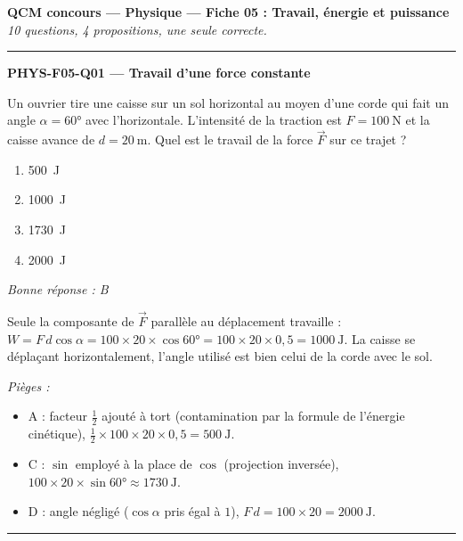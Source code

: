 \documentclass[11pt,a4paper]{article}
\newcommand{\vv}[1]{\vec{#1}}\newcommand{\ds}{\displaystyle}
\begin{document}
\begin{center}
{\large\bfseries QCM concours --- Physique --- Fiche 05 : Travail, énergie et puissance}\\
\textit{10 questions, 4 propositions, une seule correcte.}
\end{center}
\vspace{6pt}\hrule\vspace{10pt}

\noindent\textbf{PHYS-F05-Q01 --- Travail d'une force constante}\par
Un ouvrier tire une caisse sur un sol horizontal au moyen d'une corde qui fait un angle
$\alpha=\ang{60}$ avec l'horizontale. L'intensité de la traction est $F=\qty{100}{\newton}$ et la
caisse avance de $d=\qty{20}{\metre}$. Quel est le travail de la force $\vv F$ sur ce trajet ?
\begin{center}
\end{center}
\begin{enumerate}[label=\Alph*)]
\item \qty{500}{\joule}
\item \qty{1000}{\joule}
\item \qty{1730}{\joule}
\item \qty{2000}{\joule}
\end{enumerate}
\textit{Bonne réponse : B}\par
Seule la composante de $\vv F$ parallèle au déplacement travaille :
$W=F\,d\cos\alpha=100\times20\times\cos\ang{60}=100\times20\times0{,}5=\qty{1000}{\joule}$.
La caisse se déplaçant horizontalement, l'angle utilisé est bien celui de la corde avec le sol.\par
\textit{Pièges :}
\begin{itemize}
\item A : facteur $\tfrac12$ ajouté à tort (contamination par la formule de l'énergie cinétique),
$\tfrac12\times100\times20\times0{,}5=\qty{500}{\joule}$.
\item C : $\sin$ employé à la place de $\cos$ (projection inversée),
$100\times20\times\sin\ang{60}\approx\qty{1730}{\joule}$.
\item D : angle négligé ($\cos\alpha$ pris égal à $1$), $F\,d=100\times20=\qty{2000}{\joule}$.
\end{itemize}
\vspace{8pt}\hrule\vspace{8pt}
\end{document}
